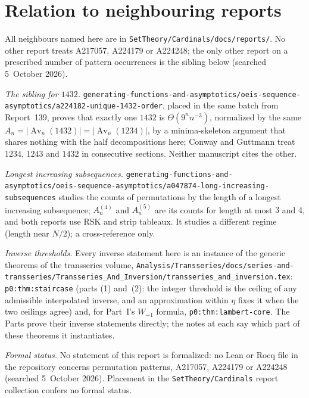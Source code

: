 \documentclass[11pt,letterpaper]{article}
\theoremstyle{remark}\newtheorem{remark}[theorem]{Remark}
\numberwithin{equation}{section}
\newcommand{\Av}{\operatorname{Av}}
\newcommand{\file}[1]{\nolinkurl{#1}}
\begin{document}
\section*{Relation to neighbouring reports}\label{upo:sec:neighbours}
All neighbours named here are in \file{SetTheory/Cardinals/docs/reports/}. No other report treats A217057, A224179 or A224248; the only other report on a prescribed number of pattern occurrences is the sibling below (searched 5~October 2026).

\emph{The sibling for $1432$.} \file{generating-functions-and-asymptotics/oeis-sequence-asymptotics/a224182-unique-1432-order}, placed in the same batch from Report~139, proves that exactly one $1432$ is $\Theta(9^nn^{-3})$, normalized by the same $A_n=|\Av_n(1432)|=|\Av_n(1234)|$, by a minima-skeleton argument that shares nothing with the half decompositions here; Conway and Guttmann treat $1234$, $1243$ and $1432$ in consecutive sections. Neither manuscript cites the other.

\emph{Longest increasing subsequences.} \file{generating-functions-and-asymptotics/oeis-sequence-asymptotics/a047874-long-increasing-subsequences} studies the counts of permutations by the length of a longest increasing subsequence; $A^{(4)}_n$ and $A^{(5)}_n$ are its counts for length at most $3$ and $4$, and both reports use RSK and strip tableaux. It studies a different regime (length near $N/2$); a cross-reference only.

\emph{Inverse thresholds.} Every inverse statement here is an instance of the generic theorems of the transseries volume, \file{Analysis/Transseries/docs/series-and-transseries/Transseries_And_Inversion/transseries_and_inversion.tex}: \texttt{p0:thm:staircase} (parts (1) and~(2): the integer threshold is the ceiling of any admissible interpolated inverse, and an approximation within $\eta$ fixes it when the two ceilings agree) and, for Part~I's $W_{-1}$ formula, \texttt{p0:thm:lambert-core}. The Parts prove their inverse statements directly; the notes at each say which part of these theorems it instantiates.

\emph{Formal status.} No statement of this report is formalized: no Lean or Rocq file in the repository concerns permutation patterns, A217057, A224179 or A224248 (searched 5~October 2026). Placement in the \file{SetTheory/Cardinals} report collection confers no formal status.
\clearpage
\end{document}
